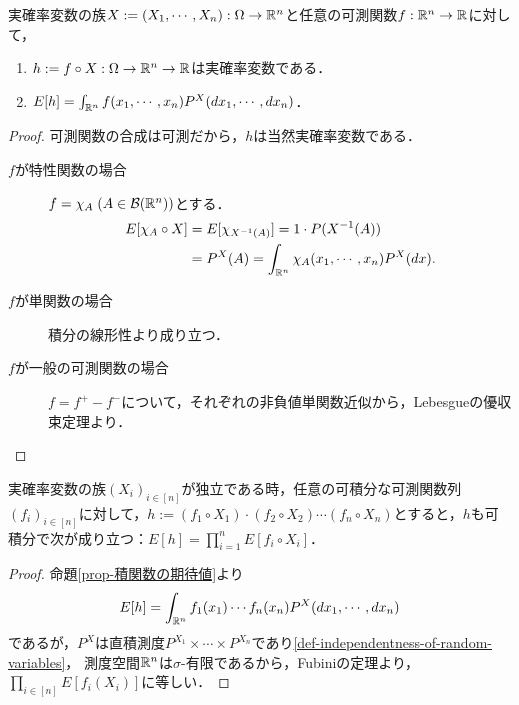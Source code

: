 \documentclass[uplatex,dvipdfmx]{jsreport}
\begin{document}
\begin{proposition}[実空間の議論への持ち上げ]\label{prop-積関数の期待値}
    実確率変数の族$X:=(X_1,\cdots,X_n):\Omega\to\mathbb{R}^n$と任意の可測関数$f:\mathbb{R}^n\to\mathbb{R}$に対して，
    \begin{enumerate}
        \item $h:=f\circ X:\Omega\to\mathbb{R}^n\to\mathbb{R}$は実確率変数である．
        \item $E[h]=\int_{\mathbb{R}^n}f(x_1,\cdots,x_n)P^X(dx_1,\cdots,dx_n)$．
    \end{enumerate}
\end{proposition}
\begin{proof}
    可測関数の合成は可測だから，$h$は当然実確率変数である．
    \begin{description}
        \item[$f$が特性関数の場合] $f=\chi_A\;(A\in\mathcal{B}(\mathbb{R}^n))$とする．
        \begin{align*}
            E[\chi_A\circ X]&=E[\chi_{X^{-1}(A)}]=1\cdot P(X^{-1}(A))\\
            &=P^X(A)=\int_{\mathbb{R}^n}\chi_A(x_1,\cdots,x_n)P^X(dx).
        \end{align*}
        \item[$f$が単関数の場合]
        積分の線形性より成り立つ．
        \item[$f$が一般の可測関数の場合]
        $f=f^+-f^-$について，それぞれの非負値単関数近似から，Lebesgueの優収束定理より．
    \end{description}
\end{proof}

\begin{corollary}[期待値が積を保つ条件]\label{cor-mean-of-product-of-independent-variables}
    実確率変数の族$(X_i)_{i\in[n]}$が独立である時，任意の可積分な可測関数列$(f_i)_{i\in[n]}$に対して，$h:=(f_1\circ X_1)\cdot(f_2\circ X_2)\cdots(f_n\circ X_n)$とすると，$h$も可積分で次が成り立つ：$E[h]=\prod_{i=1}^nE[f_i\circ X_i]$．
\end{corollary}
\begin{proof}
    命題\ref{prop-積関数の期待値}より
    \[E[h]=\int_{\mathbb{R}^n}f_1(x_1)\cdots f_n(x_n)P^X(dx_1,\cdots,dx_n)\]
    であるが，$P^X$は直積測度$P^{X_1}\times\cdots\times P^{X_n}$であり\ref{def-independentness-of-random-variables}，
    測度空間$\mathbb{R}^n$は$\sigma$-有限であるから，Fubiniの定理より，$\prod_{i\in[n]}E[f_i(X_i)]$に等しい．
\end{proof}
\end{document}
